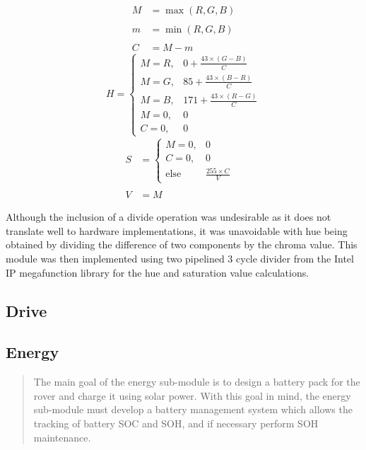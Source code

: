 \documentclass[a4paper]{article}
\begin{document}
\begin{multicols}{3}
    \noindent
    \begin{align*}
        M &= \max(R, G, B) \\ \\
        m &= \min(R, G, B) \\ \\
        C &= M-m 
    \end{align*}
    \begin{equation*}
        H = \begin{cases}
            M = R, & 0 + \frac{43 \times (G-B)}{C} \\
            M = G, & 85 + \frac{43 \times (B-R)}{C} \\
            M = B, & 171 + \frac{43 \times (R-G)}{C} \\
            M = 0, & 0 \\
            C = 0, & 0
        \end{cases} 
    \end{equation*}
    \begin{align*}
        S &= \begin{cases}
            M = 0, & 0 \\ C = 0, & 0 \\ \text{else} & \frac{255\times C}{V}
        \end{cases} & \\ \\
         V &= M  
    \end{align*}
\end{multicols}



Although the inclusion of a divide operation was undesirable as it does not 
translate well to hardware implementations, it was unavoidable with hue being 
obtained by dividing the difference of two components by the chroma value. This 
module was then implemented using two pipelined 3 cycle divider from the Intel IP
megafunction library for the hue and saturation value calculations.  



\subsection{Drive}

\subsection{Energy}
\begin{abstract}
The main goal of the energy sub-module is to design a battery pack for the rover and charge it using solar power. With this goal in mind, the energy sub-module must develop a battery management system which allows the tracking of battery SOC and SOH, and if necessary perform SOH maintenance. 
    
\end{abstract}
\end{document}
